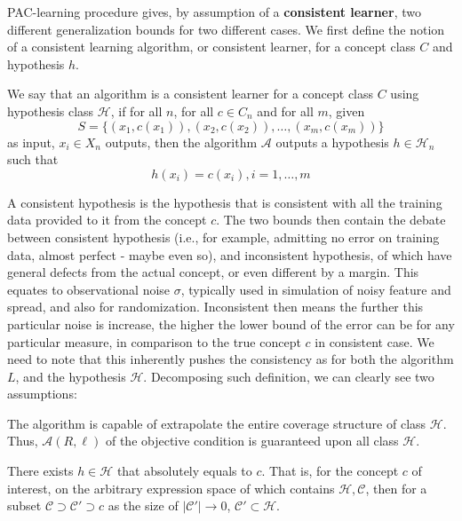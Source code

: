 PAC-learning procedure gives, by assumption of a \textbf{consistent learner}, two different generalization bounds for two different cases. We first define the notion of a consistent learning algorithm, or consistent learner, for a concept class $C$ and hypothesis $h$. 
{
    \small
    \begin{definition}
    We say that an algorithm is a consistent learner for a concept class $C$ using hypothesis class $\mathcal{H}$, if for all $n$, for all $c\in C_n$ and for all $m$, given 
    \begin{equation*}
        S = \{ (x_1, c(x_1)) , (x_2, c(x_2)) ,\dots, (x_m, c(x_m))  \} 
    \end{equation*}
    as input, $x_i \in X_n$ outputs, then the algorithm $\mathcal{A}$ outputs a hypothesis $h\in \mathcal{H}_n$ such that $$h(x_i) = c(x_i) , i = 1,\dots,m$$ 
    \end{definition}
}
A consistent hypothesis is the hypothesis that is consistent with all the training data provided to it from the concept $c$. The two bounds then contain the debate between consistent hypothesis (i.e., for example, admitting no error on training data, almost perfect - maybe even so), and inconsistent hypothesis, of which have general defects from the actual concept, or even different by a margin. This equates to observational noise $\sigma$, typically used in simulation of noisy feature and spread, and also for randomization. Inconsistent then means the further this particular noise is increase, the higher the lower bound of the error can be for any particular measure, in comparison to the true concept $c$ in consistent case. We need to note that this inherently pushes the consistency as for both the algorithm $L$, and the hypothesis $\mathcal{H}$. Decomposing such definition, we can clearly see two assumptions:

\begin{assumption}
    The algorithm is capable of extrapolate the entire coverage structure of class $\mathcal{H}$. Thus, $\mathcal{A}(R,\ell)$ of the objective condition is guaranteed upon all class $\mathcal{H}$. 
\end{assumption}

\begin{assumption}
    There exists $h\in \mathcal{H}$ that absolutely equals to $c$. That is, for the concept $c$ of interest, on the arbitrary expression space of which contains $\mathcal{H},\mathcal{C}$, then for a subset $\mathcal{C}\supset\mathcal{C}'\supset c$ as the size of $|\mathcal{C}'|\to 0$, $\mathcal{C}'\subset \mathcal{H}$. 
\end{assumption}

